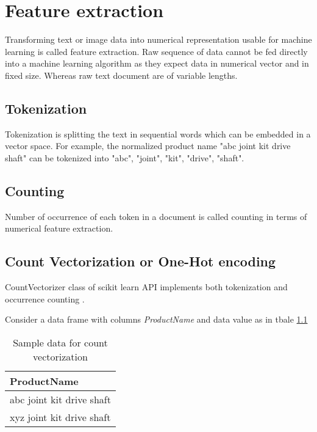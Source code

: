 \chapter{Feature extraction}

Transforming text or image data into numerical representation usable for machine learning is called feature extraction. Raw sequence of data cannot be fed directly into a machine learning algorithm as they expect data in numerical vector and in fixed size. Whereas raw text document are of variable lengths. 

\section{Tokenization}

Tokenization is splitting the text in sequential words which can be embedded in a vector space.
For example, the normalized product name "abc joint kit drive shaft" can be tokenized into "abc", "joint", "kit", "drive", "shaft". 



\section{Counting}

Number of occurrence of each token in a document is called counting in terms of numerical feature extraction.

\section{Count Vectorization or One-Hot encoding}


CountVectorizer class of scikit learn API implements both tokenization and occurrence counting \parencite{sklearn_api}. 

Consider a data frame with columns \textit{ProductName} and data value as in tbale \ref{table:count_vectorization}

\begin{table}[h]
    \centering
    \caption{Sample data for count vectorization}
    \label{table:count_vectorization}
    \begin{tabular}{ l }
          \toprule
          
          \textbf{ProductName}\\
          \midrule
          abc joint kit drive shaft\\
          xyz joint kit drive shaft\\
         
          \bottomrule
          \end{tabular}
\end{table}

